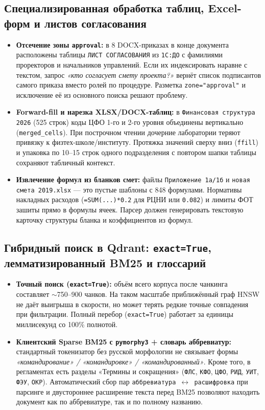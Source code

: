 \documentclass[10pt,a4paper]{article}
\begin{document}
\subsection{Специализированная обработка таблиц, Excel-форм и листов согласования}
\begin{itemize}
    \item \textbf{Отсечение зоны \texttt{approval}:} в 8 DOCX-приказах в конце документа расположены таблицы \texttt{ЛИСТ СОГЛАСОВАНИЯ} из \texttt{1С:ДО} с фамилиями проректоров и начальников управлений. Если их индексировать наравне с текстом, запрос \emph{«кто согласует смету проекта?»} вернёт список подписантов самого приказа вместо ролей по процедуре. Разметка \texttt{zone="approval"} и исключение её из основного поиска решают проблему.
    \item \textbf{Forward-fill и нарезка XLSX/DOCX-таблиц:} в \texttt{Финансовая структура 2026} (525 строк) коды ЦФО 1-го и 2-го уровня объединены вертикально (\texttt{merged\_cells}). При построчном чтении дочерние лаборатории теряют привязку к физтех-школе/институту. Протяжка значений сверху вниз (\texttt{ffill}) и упаковка по 10--15 строк одного подразделения с повтором шапки таблицы сохраняют табличный контекст.
    \item \textbf{Извлечение формул из бланков смет:} файлы \texttt{Приложение 1а/1б} и \texttt{новая смета 2019.xlsx} — это пустые шаблоны с 848 формулами. Нормативы накладных расходов (\texttt{=SUM(...)*0.2} для РЦНИ или \texttt{0.082}) и лимиты ФОТ зашиты прямо в формулы ячеек. Парсер должен генерировать текстовую карточку структуры бланка и коэффициентов из формул.
\end{itemize}

\subsection{Гибридный поиск в Qdrant: \texttt{exact=True}, лемматизированный BM25 и глоссарий}
\begin{itemize}
    \item \textbf{Точный поиск (\texttt{exact=True}):} объём всего корпуса после чанкинга составляет $\sim$750--900 чанков. На таком масштабе приближённый граф HNSW не даёт выигрыша в скорости, но может терять редкие точные совпадения при фильтрации. Полный перебор (\texttt{exact=True}) работает за единицы миллисекунд со 100\% полнотой.
    \item \textbf{Клиентский Sparse BM25 с \texttt{pymorphy3} + словарь аббревиатур:} стандартный токенизатор без русской морфологии не связывает формы \emph{«командирование» / «командировке» / «командированный»}. Кроме того, в регламентах есть разделы «Термины и сокращения» (\texttt{ФЛС}, \texttt{КФО}, \texttt{ЦФО}, \texttt{РИД}, \texttt{УИТ}, \texttt{ФЭУ}, \texttt{ОКР}). Автоматический сбор пар \texttt{аббревиатура $\leftrightarrow$ расшифровка} при парсинге и двустороннее расширение текста перед BM25 позволяют находить документ как по аббревиатуре, так и по полному названию.
\end{itemize}
\end{document}
